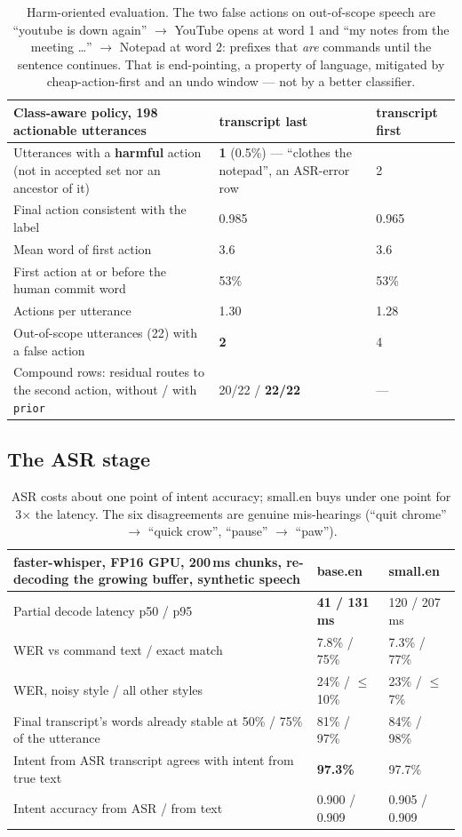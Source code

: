 \documentclass[11pt,a4paper]{article}
\newcommand{\code}[1]{\texttt{#1}}
\begin{document}
\begin{table}[H]
\centering\small
\begin{tabularx}{\textwidth}{X L{46mm} R{22mm}}
\toprule
Class-aware policy, 198 actionable utterances & transcript last & transcript first \\
\midrule
Utterances with a \textbf{harmful} action (not in accepted set nor an ancestor of it) & \textbf{1} (0.5\%) --- ``clothes the notepad'', an ASR-error row & 2 \\
Final action consistent with the label & 0.985 & 0.965 \\
Mean word of first action & 3.6 & 3.6 \\
First action at or before the human commit word & 53\% & 53\% \\
Actions per utterance & 1.30 & 1.28 \\
Out-of-scope utterances (22) with a false action & \textbf{2} & 4 \\
Compound rows: residual routes to the second action, without / with \code{prior} & 20/22 / \textbf{22/22} & --- \\
\bottomrule
\end{tabularx}
\caption{Harm-oriented evaluation. The two false actions on out-of-scope speech are ``youtube is down again'' $\to$ YouTube opens at word 1 and ``my notes from the meeting \ldots'' $\to$ Notepad at word 2: prefixes that \emph{are} commands until the sentence continues. That is end-pointing, a property of language, mitigated by cheap-action-first and an undo window --- not by a better classifier.}
\end{table}

\subsection{The ASR stage}
\begin{table}[H]
\centering\small
\begin{tabularx}{\textwidth}{X R{24mm} R{24mm}}
\toprule
faster-whisper, FP16 GPU, 200\,ms chunks, re-decoding the growing buffer, synthetic speech & base.en & small.en \\
\midrule
Partial decode latency p50 / p95 & \textbf{41 / 131\,ms} & 120 / 207\,ms \\
WER vs command text / exact match & 7.8\% / 75\% & 7.3\% / 77\% \\
WER, noisy style / all other styles & 24\% / $\le$10\% & 23\% / $\le$7\% \\
Final transcript's words already stable at 50\% / 75\% of the utterance & 81\% / 97\% & 84\% / 98\% \\
Intent from ASR transcript agrees with intent from true text & \textbf{97.3\%} & 97.7\% \\
Intent accuracy from ASR / from text & 0.900 / 0.909 & 0.905 / 0.909 \\
\bottomrule
\end{tabularx}
\caption{ASR costs about one point of intent accuracy; small.en buys under one point for 3$\times$ the latency. The six disagreements are genuine mis-hearings (``quit chrome'' $\to$ ``quick crow'', ``pause'' $\to$ ``paw'').}
\end{table}
\end{document}

